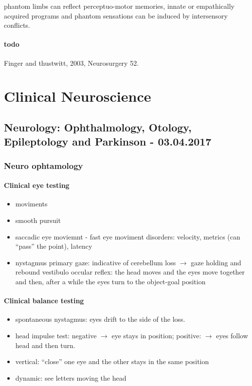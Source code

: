 \documentclass[12pt,article,oneside,a4paper]{memoir}
\begin{document}
phantom limbs can reflect perceptuo-motor memories, innate or empathically
acquired programs and phantom sensations can be induced by intersensory conflicts.

\paragraph{todo} Finger and thustwitt, 2003, Neurosurgery 52.

\newpage
\section{Clinical Neuroscience}

\subsection{Neurology: Ophthalmology, Otology, Epileptology and Parkinson - 03.04.2017}
\subsubsection{Neuro ophtamology}
\paragraph{Clinical eye testing}  
\begin{itemize}
\item moviments
\item smooth pursuit
\item saccadic eye moviemnt - fast eye moviment
\subitem disorders: velocity, metrics (can ``pass'' the point), latency
\item nystagmus
\subitem primary gaze: indicative of cerebellum loss $\rightarrow$ gaze holding and rebound
\subitem vestibulo occular reflex: the head moves and the eyes move together and then, after a while the eyes turn to the object-goal position
\end{itemize}

\paragraph{Clinical balance testing}
\begin{itemize}
\item spontaneous nystagmus: eyes drift to the side of the loss.
\item head impulse test: negative $\rightarrow$ eye stays in position; positive: $\rightarrow$ eyes follow head and then turn.
\item vertical: ``close'' one eye and the other stays in the same position
\item dynamic: see letters moving the head
\end{itemize}
\end{document}
